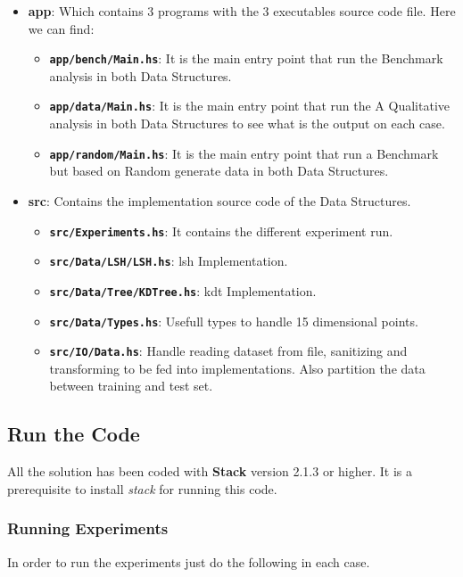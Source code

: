 \documentclass[12pt, a4paper]{article}
\begin{document}
\begin{itemize}
  \item \textbf{app}: Which contains 3 programs with the 3 executables source code file. Here we can find:
    \begin{itemize}
      \item \textbf{\texttt{app/bench/Main.hs}}: It is the main entry point that run the Benchmark analysis in both Data Structures.
      \item \textbf{\texttt{app/data/Main.hs}}: It is the main entry point that run the A Qualitative analysis in both Data Structures to see what is the output on each case.
      \item \textbf{\texttt{app/random/Main.hs}}: It is the main entry point that run a Benchmark but based on Random generate data in both Data Structures.
    \end{itemize}
  \item \textbf{src}: Contains the implementation source code of the Data Structures.
    \begin{itemize}
      \item \textbf{\texttt{src/Experiments.hs}}: It contains the different experiment run.
      \item \textbf{\texttt{src/Data/LSH/LSH.hs}}: \acrshort{lsh} Implementation.
      \item \textbf{\texttt{src/Data/Tree/KDTree.hs}}: \acrshort{kdt} Implementation.
      \item \textbf{\texttt{src/Data/Types.hs}}: Usefull types to handle 15 dimensional points.
      \item \textbf{\texttt{src/IO/Data.hs}}: Handle reading dataset from file, sanitizing and transforming to be fed into implementations. Also partition the data between training and test set.
    \end{itemize}

\end{itemize}

\subsection{Run the Code}
All the solution has been coded with \textbf{Stack} \cite{stack} version 2.1.3 or higher. It is a prerequisite to install \textit{stack} for running this code.

\subsubsection{Running Experiments}
In order to run the experiments just do the following in each case.
\end{document}
